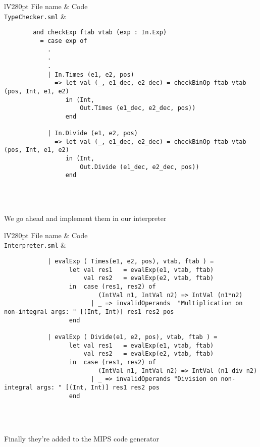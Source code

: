 \documentclass[]{article}
\newcommand{\command}[1]{\texttt{\string#1}}
\begin{document}
\begin{center}	
	\begin{tabular}{lV{280pt}}
		\toprule
		File name & Code\\
		\midrule
		\command{TypeChecker.sml} &
		\begin{verbatim}
		and checkExp ftab vtab (exp : In.Exp)
		  = case exp of
		    .
		    .
		    .
		    | In.Times (e1, e2, pos)
		      => let val (_, e1_dec, e2_dec) = checkBinOp ftab vtab (pos, Int, e1, e2)
		         in (Int,
		             Out.Times (e1_dec, e2_dec, pos))
		         end
		 
		    | In.Divide (e1, e2, pos)
		      => let val (_, e1_dec, e2_dec) = checkBinOp ftab vtab (pos, Int, e1, e2)
		         in (Int,
		             Out.Divide (e1_dec, e2_dec, pos))
		         end		
		\end{verbatim}
		\\
		\bottomrule \\
	\end{tabular}
\end{center}

We go ahead and implement them in our interpreter

\begin{center}	
	\begin{tabular}{lV{280pt}}
		\toprule
		File name & Code\\
		\midrule
		\command{Interpreter.sml} &
		\begin{verbatim}
			| evalExp ( Times(e1, e2, pos), vtab, ftab ) =
			      let val res1   = evalExp(e1, vtab, ftab)
			          val res2   = evalExp(e2, vtab, ftab)
			      in  case (res1, res2) of
			              (IntVal n1, IntVal n2) => IntVal (n1*n2)
			            | _ => invalidOperands  "Multiplication on non-integral args: " [(Int, Int)] res1 res2 pos
			      end
			  
			| evalExp ( Divide(e1, e2, pos), vtab, ftab ) =
			      let val res1   = evalExp(e1, vtab, ftab)
			          val res2   = evalExp(e2, vtab, ftab)
			      in  case (res1, res2) of
			              (IntVal n1, IntVal n2) => IntVal (n1 div n2)
			            | _ => invalidOperands "Division on non-integral args: " [(Int, Int)] res1 res2 pos
			      end
		\end{verbatim}
		\\
		\bottomrule \\
	\end{tabular}
\end{center}

Finally they're added to the MIPS code generator
\end{document}
